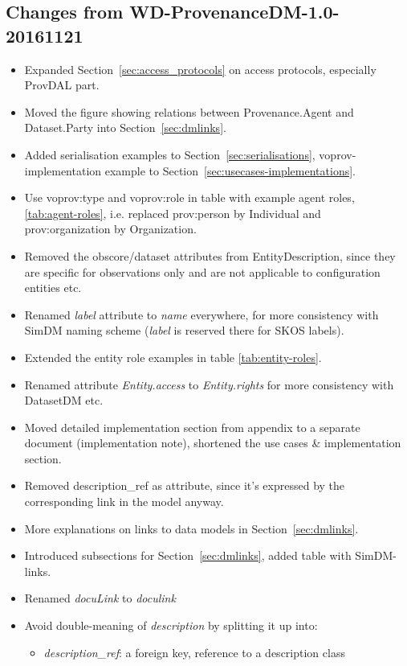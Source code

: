 \documentclass[11pt,a4paper]{ivoa}
\begin{document}
\subsection{Changes from WD-ProvenanceDM-1.0-20161121}
\begin{itemize}
\item Expanded Section~\ref{sec:access_protocols} on access protocols, especially ProvDAL part.
\item Moved the figure showing relations between Provenance.Agent and Dataset.Party into Section~\ref{sec:dmlinks}.
\item Added serialisation examples to Section~\ref{sec:serialisations}, voprov-implementation example to Section~\ref{sec:usecases-implementations}.
\item Use voprov:type and voprov:role in table with example agent roles, \ref{tab:agent-roles}, i.e. replaced prov:person by Individual and prov:organization by Organization.
\item Removed the obscore/dataset attributes from EntityDescription, since they are specific for observations only and are not applicable to configuration entities etc.
\item Renamed \emph{label} attribute to \emph{name} everywhere, for more consistency with SimDM naming scheme (\emph{label} is reserved there for SKOS labels).
\item Extended the entity role examples in table \ref{tab:entity-roles}.
\item Renamed attribute \emph{Entity.access} to \emph{Entity.rights} for more consistency with DatasetDM etc.
\item Moved detailed implementation section from appendix to a separate document (implementation note), shortened the use cases \& implementation section.
\item Removed description\_ref as attribute, since it's expressed by the corresponding link in the model anyway.
\item More explanations on links to data models in Section~\ref{sec:dmlinks}.
\item Introduced subsections for Section~\ref{sec:dmlinks}, added table with SimDM-links.
\item Renamed \emph{docuLink} to \emph{doculink}
\item Avoid double-meaning of \emph{description} by splitting it up into: 
    \begin{itemize}
    \item \emph{description\_ref}: a foreign key, reference to a description class 

\end{itemize}
\end{itemize}
\end{document}
